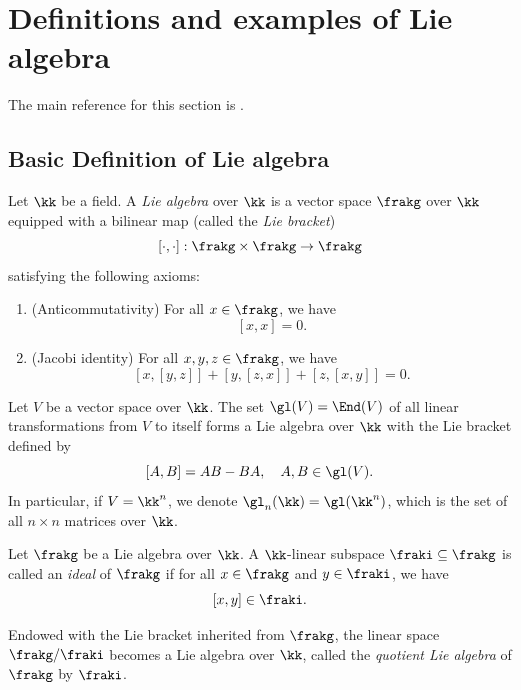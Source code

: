 \section{Definitions and examples of Lie algebra}

The main reference for this section is \cite{Hum80}.

\subsection{Basic Definition of Lie algebra}

    \begin{definition}\label{def:Lie_algebra}
        Let \(\kk\) be a field.
        A \emph{Lie algebra} over \(\kk\) is a vector space \(\frakg\) over \(\kk\) equipped with a bilinear map (called the \emph{Lie bracket})
        \[[\cdot,\cdot]:\frakg\times \frakg\to \frakg\]
        satisfying the following axioms:
        \begin{enumerate}
            \item (Anticommutativity) For all \(x \in \frakg\), we have
            \[[x,x]=0.\]
            \item (Jacobi identity) For all \(x,y,z\in \frakg\), we have
            \[[x,[y,z]]+[y,[z,x]]+[z,[x,y]]=0.\]
        \end{enumerate}
    \end{definition}

    \begin{example}\label{eg:linear_Lie_algebra}
        Let \(V\) be a vector space over \(\kk\).
        The set \(\gl(V) = \End(V)\) of all linear transformations from \(V\) to itself forms a Lie algebra over \(\kk\) with the Lie bracket defined by
        \[[A,B]=AB-BA,\quad A,B\in \gl(V).\]
        In particular, if \(V=\kk^n\), we denote \(\gl_n(\kk)=\gl(\kk^n)\), which is the set of all \(n\times n\) matrices over \(\kk\).
    \end{example}

    \begin{definition}\label{def:ideal_of_Lie_algebra}
        Let \(\frakg\) be a Lie algebra over \(\kk\).
        A \(\kk\)-linear subspace \(\fraki\subseteq \frakg\) is called an \emph{ideal} of \(\frakg\) if for all \(x\in \frakg\) and \(y\in \fraki\), we have
        \[[x,y]\in \fraki.\]

        Endowed with the Lie bracket inherited from \(\frakg\), the linear space \(\frakg/\fraki\) becomes a Lie algebra over \(\kk\), called the \emph{quotient Lie algebra} of \(\frakg\) by \(\fraki\).
    \end{definition}

